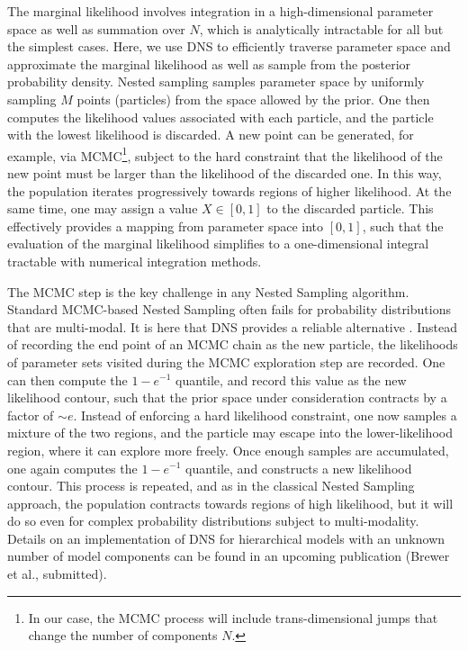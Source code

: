 \documentclass[12pt]{emulateapj}
\begin{document}
The marginal likelihood involves integration in a high-dimensional parameter space as well as summation over $N$, which is analytically intractable for all but the
simplest cases. Here, we use DNS to efficiently traverse parameter space and approximate the marginal 
likelihood as well as sample from the posterior probability density. 
Nested sampling \citep{skilling2006} samples parameter space by uniformly sampling $M$ points (particles) from the space allowed by the prior. 
One then computes the likelihood values associated with each particle, and the particle with the lowest likelihood is discarded. A new point
can be generated, for example, via MCMC\footnote{In our case, the MCMC process will include trans-dimensional jumps that change the number of components $N$.}, subject to the hard constraint that the
likelihood of the new point must be larger than the likelihood of the discarded one. In this way, the population iterates progressively towards
regions of higher likelihood. At the same time, one may assign a value $X  \in [0, 1]$ to the discarded particle. This effectively provides a 
mapping from parameter space into $[0,1]$, such that the evaluation of the marginal likelihood simplifies to a one-dimensional 
integral tractable with numerical integration methods.

The MCMC step is the key challenge in any Nested Sampling algorithm. Standard MCMC-based Nested Sampling often fails for probability distributions that
are multi-modal. It is here that DNS provides a reliable alternative \citep[for details, see][]{brewer2011}. 
Instead of recording the end point of an MCMC chain as the new particle, the likelihoods of parameter sets visited during the MCMC exploration step
 are recorded. One can then compute the $1-e^{-1}$ quantile, and record this value as the new likelihood contour, such that the prior space
 under consideration contracts by a factor of $\sim\!\! e$. Instead of enforcing a hard likelihood constraint, one now samples a mixture of the 
 two regions, and the particle may escape into the lower-likelihood region, where it can explore more freely. Once enough samples are accumulated,
 one again computes the $1-e^{-1}$ quantile, and constructs a new likelihood contour. This process is repeated, and as in the classical Nested Sampling
 approach, the population contracts towards regions of high likelihood, but it will do so even for complex probability distributions subject to multi-modality.
 Details on an implementation of DNS for hierarchical models with an unknown number of model components can be found in an upcoming publication (Brewer et al., submitted).
 
\end{document}
